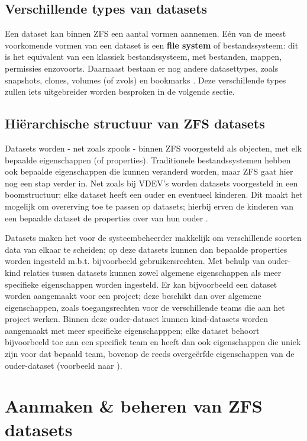 \subsection{Verschillende types van datasets}

Een dataset kan binnen ZFS een aantal vormen aannemen. Eén van de meest voorkomende vormen van een dataset is een \textbf{file system} of bestandssysteem: dit is het equivalent van een klassiek bestandssysteem, met bestanden, mappen, permissies enzovoorts. Daarnaast bestaan er nog andere datasettypes, zoals snapshots, clones, volumes (of zvols) en bookmarks \autocite{Lucas2015}. Deze verschillende types zullen iets uitgebreider worden besproken in de volgende sectie.  

\subsection{Hiërarchische structuur van ZFS datasets}

Datasets worden - net zoals zpools - binnen ZFS voorgesteld als objecten, met elk bepaalde eigenschappen (of properties). Traditionele bestandssystemen hebben ook bepaalde eigenschappen die kunnen veranderd worden, maar ZFS gaat hier nog een stap verder in. Net zoals bij VDEV's worden datasets voorgesteld in een boomstructuur: elke dataset heeft een ouder en eventueel kinderen. Dit maakt het mogelijk om overerving toe te passen op datasets; hierbij erven de kinderen van een bepaalde dataset de properties over van hun ouder \autocite{FBSDDP2017}.

Datasets maken het voor de systeembeheerder makkelijk om verschillende soorten data van elkaar te scheiden; op deze datasets kunnen dan bepaalde properties worden ingesteld m.b.t. bijvoorbeeld gebruikersrechten. Met behulp van ouder-kind relaties tussen datasets kunnen zowel algemene eigenschappen als meer specifieke eigenschappen worden ingesteld. Er kan bijvoorbeeld een dataset worden aangemaakt voor een project; deze beschikt dan over algemene eigenschappen, zoals toegangsrechten voor de verschillende teams die aan het project werken. Binnen deze ouder-dataset kunnen kind-datasets worden aangemaakt met meer specifieke eigenschapppen; elke dataset behoort bijvoorbeeld toe aan een specifiek team en heeft dan ook eigenschappen die uniek zijn voor dat bepaald team, bovenop de reeds overgeërfde eigenschappen van de ouder-dataset (voorbeeld naar \textcite{Lucas2015}).

\section{Aanmaken \& beheren van ZFS datasets}

